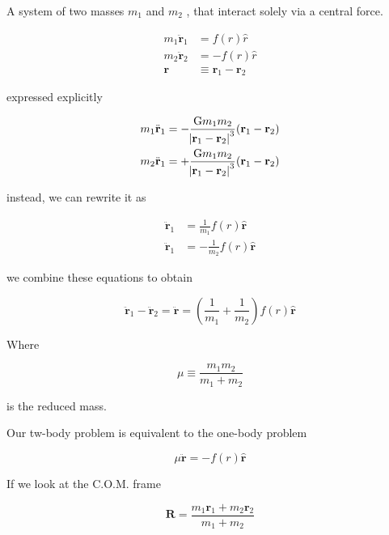 A system of two masses $m_1$ and $m_2$ , that interact solely via a central force.

\begin{align}
	m_1 \ddot{\mathbf{r}}_1 &= f(r) \hat r\\
	m_2 \ddot{\mathbf{r}}_2 &= - f(r) \hat r\\
	\mathbf{r} &\equiv \mathbf{r}_1 - \mathbf{r}_2
\end{align}

expressed explicitly

\begin{align}
	m_1 \ddot{\mathbf{r}}_1 &= - \frac{\mathrm{G}m_1 m_2}{\abs{\mathbf{r}_1 - \mathbf{r}_2}^3} (\mathbf{r}_1 - \mathbf{r}_2)\\
	m_2 \ddot{\mathbf{r}}_1 &= + \frac{\mathrm{G}m_1 m_2}{\abs{\mathbf{r}_1 - \mathbf{r}_2}^3} (\mathbf{r}_1 - \mathbf{r}_2)
\end{align}

instead, we can rewrite it as

\begin{align}
	\ddot{\mathbf{r}}_1 &= \frac{1}{m_1} f(r) \hat{\mathbf{r}}\\
	\ddot{\mathbf{r}}_1 &= - \frac{1}{m_2} f(r) \hat{\mathbf{r}}
\end{align}

we combine these equations to obtain

\begin{equation}
	\ddot{\mathbf{r}}_1 - \ddot{\mathbf{r}}_2 = \ddot{\mathbf{r}} = \left(\frac{1}{m_1} + \frac{1}{m_2}\right) f(r) \hat{\mathbf{r}}
\end{equation}

Where

\begin{equation}
	\mu \equiv \frac{m_1 m_2}{m_1 + m_2}
\end{equation}

is the reduced mass.

Our tw-body problem is equivalent to the one-body problem

\begin{equation}
	\mu \ddot{\mathbf{r}} = - f(r) \hat{\mathbf{r}}
\end{equation}

If we look at the C.O.M. frame

\begin{equation}
	\mathbf{R} = \frac{m_1 \mathbf{r}_1 + m_2 \mathbf{r}_2}{m_1 + m_2}
\end{equation}

